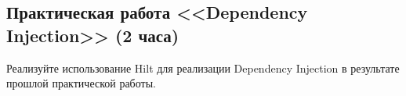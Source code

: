 \subsection{Практическая работа <<Dependency Injection>> (2 часа)}

Реализуйте использование Hilt для реализации Dependency Injection в результате прошлой практической работы.

